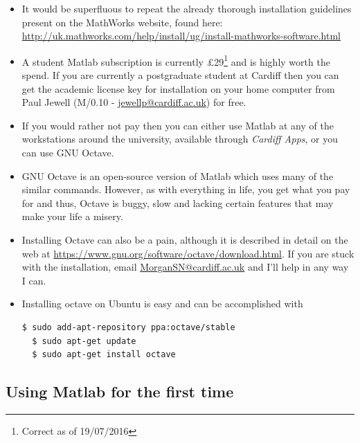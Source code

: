 \documentclass[12pt]{report}
\begin{document}
\begin{itemize}
\item It would be superfluous to repeat the already thorough installation guidelines present on the MathWorks website, found here: \\
\small \url{http://uk.mathworks.com/help/install/ug/install-mathworks-software.html}
\normalsize
\item A student Matlab subscription is currently £29\footnote{Correct as of 19/07/2016} and is highly worth the spend. If you are currently a postgraduate student at Cardiff then you can get the academic license key for installation on your home computer from Paul Jewell (M/0.10 - \url{jewellp@cardiff.ac.uk}) for free.
\item If you would rather not pay then you can either use Matlab at any of the workstations around the university, available through \textit{Cardiff Apps}, or you can use GNU Octave.
\item GNU Octave is an open-source version of Matlab which uses many of the similar commands. However, as with everything in life, you get what you pay for and thus, Octave is buggy, slow and lacking certain features that may make your life a misery.
\item Installing Octave can also be a pain, although it is described in detail on the web at \url{https://www.gnu.org/software/octave/download.html}. If you are stuck with the installation, email \url{MorganSN@cardiff.ac.uk} and I'll help in any way I can.
\item Installing octave on Ubuntu is easy and can be accomplished with
\begin{lstlisting}[language=bash]
  $ sudo add-apt-repository ppa:octave/stable
  $ sudo apt-get update
  $ sudo apt-get install octave
\end{lstlisting}
\end{itemize}

\subsection*{Using Matlab for the first time}
\end{document}
